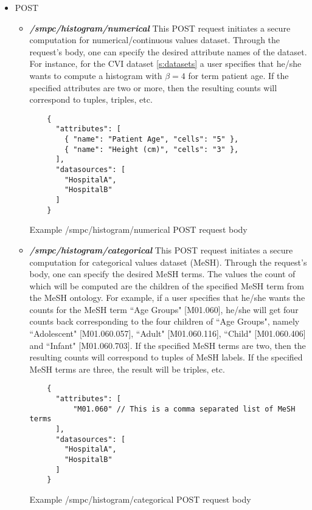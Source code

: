 \begin{itemize}
  \item POST
  \begin{itemize}[label=$\circ$]

    \item \textbf{\textit{/smpc/histogram/numerical}}
    This POST request initiates a secure computation for numerical/continuous values dataset.
    Through the request's body, one can specify the desired attribute names of the dataset.
    For instance, for the CVI dataset \ref{s:datasets} a user specifies that he/she wants to compute a histogram with $\beta = 4$ for term patient age.
    If the specified attributes are two or more, then the resulting counts will correspond to tuples, triples, etc.

    \begin{listing}[H]
    \begin{verbatim}
    {
      "attributes": [
        { "name": "Patient Age", "cells": "5" },
        { "name": "Height (cm)", "cells": "3" },
      ],
      "datasources": [
        "HospitalA",
        "HospitalB"
      ]
    }
    \end{verbatim}
    \caption{Example /smpc/histogram/numerical POST request body}
    \label{sc:histogram-numerical-post}
    \end{listing}


    \item \textbf{\textit{/smpc/histogram/categorical}}
    This POST request initiates a secure computation for categorical values dataset (MeSH).
    Through the request's body, one can specify the desired MeSH terms.
    The values the count of which will be computed are the children of the specified MeSH term from the MeSH ontology.
    For example, if a user specifies that he/she wants the counts for the MeSH term ``Age Groups" [M01.060], he/she will get four counts back corresponding to the four children of ``Age Groups", namely ``Adolescent" [M01.060.057], ``Adult" [M01.060.116], ``Child" [M01.060.406] and ``Infant" [M01.060.703].
    If the specified MeSH terms are two, then the resulting counts will correspond to tuples of MeSH labels.
    If the specified MeSH terms are three, the result will be triples, etc.

    \begin{listing}[H]
    \begin{verbatim}
    {
      "attributes": [
          "M01.060" // This is a comma separated list of MeSH terms
      ],
      "datasources": [
        "HospitalA",
        "HospitalB"
      ]
    }
    \end{verbatim}
    \caption{Example /smpc/histogram/categorical POST request body}
    \label{sc:histogram-categorical-post}
    \end{listing}



\end{itemize}
\end{itemize}
